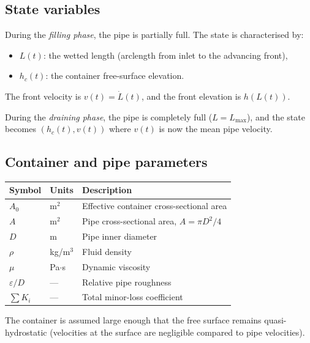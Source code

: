 \documentclass[11pt]{article}
\theoremstyle{definition}
\begin{document}
\subsection{State variables}

During the \emph{filling phase}, the pipe is partially full. The state is characterised by:
\begin{itemize}[nosep]
  \item $L(t)$: the wetted length (arclength from inlet to the advancing front),
  \item $h_c(t)$: the container free-surface elevation.
\end{itemize}
The front velocity is $v(t) = \dot{L}(t)$, and the front elevation is $h(L(t))$.

During the \emph{draining phase}, the pipe is completely full ($L = L_{\max}$), and the 
state becomes $(h_c(t), v(t))$ where $v(t)$ is now the mean pipe velocity.

\subsection{Container and pipe parameters}

\begin{center}
\renewcommand{\arraystretch}{1.2}
\begin{tabular}{lll}
\toprule
Symbol & Units & Description \\
\midrule
$A_0$ & m$^2$ & Effective container cross-sectional area \\
$A$ & m$^2$ & Pipe cross-sectional area, $A = \pi D^2/4$ \\
$D$ & m & Pipe inner diameter \\
$\rho$ & kg/m$^3$ & Fluid density \\
$\mu$ & Pa$\cdot$s & Dynamic viscosity \\
$\varepsilon/D$ & --- & Relative pipe roughness \\
$\sum K_i$ & --- & Total minor-loss coefficient \\
\bottomrule
\end{tabular}
\end{center}

The container is assumed large enough that the free surface remains quasi-hydrostatic 
(velocities at the surface are negligible compared to pipe velocities).

\end{document}
